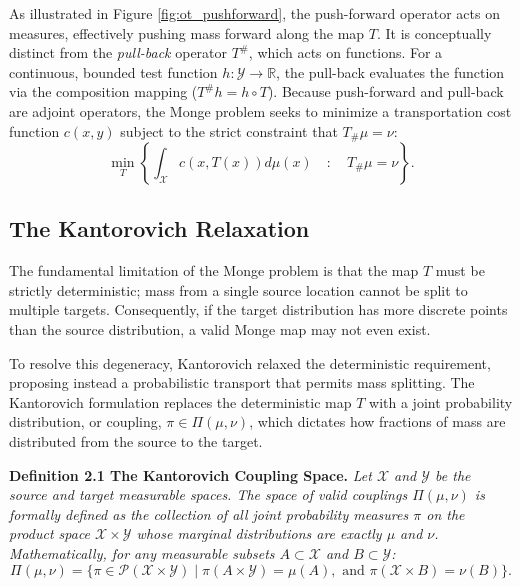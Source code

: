 \documentclass[12pt,a4paper,twoside,openany]{book}
\begin{document}
As illustrated in Figure \ref{fig:ot_pushforward}, the push-forward operator acts on measures, effectively 
pushing mass forward along the map $T$. It is conceptually distinct from the \textit{pull-back} operator $T^{\#}$, which acts on functions. 
For a continuous, bounded test function $h: \mathcal{Y} \rightarrow \mathbb{R}$, the pull-back evaluates the function via 
the composition mapping ($T^{\#} h = h \circ T$). Because push-forward and pull-back are adjoint operators, 
the Monge problem seeks to minimize a transportation cost function $c(x,y)$ subject to the strict constraint that $T_{\#}\mu = \nu$:
\begin{equation}
    \min_{T} \left\{ \int_{\mathcal{X}} c(x, T(x)) d\mu(x) \quad : \quad T_{\#}\mu = \nu \right\}.
\end{equation}

\subsection{The Kantorovich Relaxation}
The fundamental limitation of the Monge problem is that the map $T$ must be strictly deterministic; mass from 
a single source location cannot be split to multiple targets. Consequently, if the target distribution has more 
discrete points than the source distribution, a valid Monge map may not even exist. 

To resolve this degeneracy, Kantorovich \citeyear{kantorovich1942} relaxed the deterministic requirement, 
proposing instead a probabilistic transport that permits mass splitting. 
The Kantorovich formulation replaces the deterministic map $T$ with a joint probability distribution, 
or coupling, $\pi \in \Pi(\mu, \nu)$, which dictates how fractions of mass are distributed from the source to the target.

\vspace{0.5em}
\noindent\textbf{Definition 2.1 The Kantorovich Coupling Space.} \textit{Let $\mathcal{X}$ and $\mathcal{Y}$ be the source and target measurable spaces. 
The space of valid couplings $\Pi(\mu, \nu)$ is formally defined as the collection of all joint probability measures $\pi$ on the product 
space $\mathcal{X} \times \mathcal{Y}$ whose marginal distributions are exactly $\mu$ and $\nu$. Mathematically, for any measurable 
subsets $A \subset \mathcal{X}$ and $B \subset \mathcal{Y}$:}
\begin{equation}
    \Pi(\mu, \nu) = \big\{ \pi \in \mathcal{P}(\mathcal{X} \times \mathcal{Y}) \mid \pi(A \times \mathcal{Y}) = \mu(A), \text{ and } \pi(\mathcal{X} \times B) = \nu(B) \big\}.
\end{equation}
\vspace{0.5em}
\end{document}
